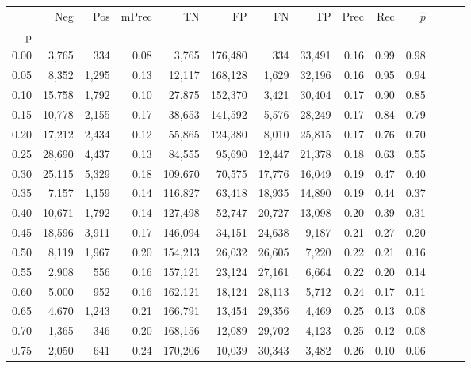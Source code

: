 \begin{tabular}{rrrrrrrrrrrrrr}
\toprule
{} &     Neg &    Pos & mPrec &       TN &       FP &      FN &      TP &  Prec &   Rec & $\hat{p}$ \\
p    &         &        &       &          &          &         &         &       &       &           \\
\midrule
0.00 &   3,765 &    334 &  0.08 &    3,765 &  176,480 &     334 &  33,491 &  0.16 &  0.99 &      0.98 \\
0.05 &   8,352 &  1,295 &  0.13 &   12,117 &  168,128 &   1,629 &  32,196 &  0.16 &  0.95 &      0.94 \\
0.10 &  15,758 &  1,792 &  0.10 &   27,875 &  152,370 &   3,421 &  30,404 &  0.17 &  0.90 &      0.85 \\
0.15 &  10,778 &  2,155 &  0.17 &   38,653 &  141,592 &   5,576 &  28,249 &  0.17 &  0.84 &      0.79 \\
0.20 &  17,212 &  2,434 &  0.12 &   55,865 &  124,380 &   8,010 &  25,815 &  0.17 &  0.76 &      0.70 \\
0.25 &  28,690 &  4,437 &  0.13 &   84,555 &   95,690 &  12,447 &  21,378 &  0.18 &  0.63 &      0.55 \\
0.30 &  25,115 &  5,329 &  0.18 &  109,670 &   70,575 &  17,776 &  16,049 &  0.19 &  0.47 &      0.40 \\
0.35 &   7,157 &  1,159 &  0.14 &  116,827 &   63,418 &  18,935 &  14,890 &  0.19 &  0.44 &      0.37 \\
0.40 &  10,671 &  1,792 &  0.14 &  127,498 &   52,747 &  20,727 &  13,098 &  0.20 &  0.39 &      0.31 \\
0.45 &  18,596 &  3,911 &  0.17 &  146,094 &   34,151 &  24,638 &   9,187 &  0.21 &  0.27 &      0.20 \\
0.50 &   8,119 &  1,967 &  0.20 &  154,213 &   26,032 &  26,605 &   7,220 &  0.22 &  0.21 &      0.16 \\
0.55 &   2,908 &    556 &  0.16 &  157,121 &   23,124 &  27,161 &   6,664 &  0.22 &  0.20 &      0.14 \\
0.60 &   5,000 &    952 &  0.16 &  162,121 &   18,124 &  28,113 &   5,712 &  0.24 &  0.17 &      0.11 \\
0.65 &   4,670 &  1,243 &  0.21 &  166,791 &   13,454 &  29,356 &   4,469 &  0.25 &  0.13 &      0.08 \\
0.70 &   1,365 &    346 &  0.20 &  168,156 &   12,089 &  29,702 &   4,123 &  0.25 &  0.12 &      0.08 \\
0.75 &   2,050 &    641 &  0.24 &  170,206 &   10,039 &  30,343 &   3,482 &  0.26 &  0.10 &      0.06 \\

\end{tabular}
